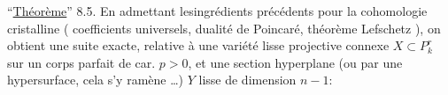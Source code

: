 ``\uline{Théorème}'' 8.5. En admettant lesingrédients précédents pour la cohomologie cristalline ( coefficients universels, dualité de Poincaré, théorème  Lefschetz ), on obtient une suite exacte, relative à une variété lisse projective connexe $X\subset P_k^r$  sur un corps parfait de car. $p>0$, et une section hyperplane (ou par une hypersurface,  cela s'y ramène \ldots) $Y$ lisse de dimension $n-1$:


